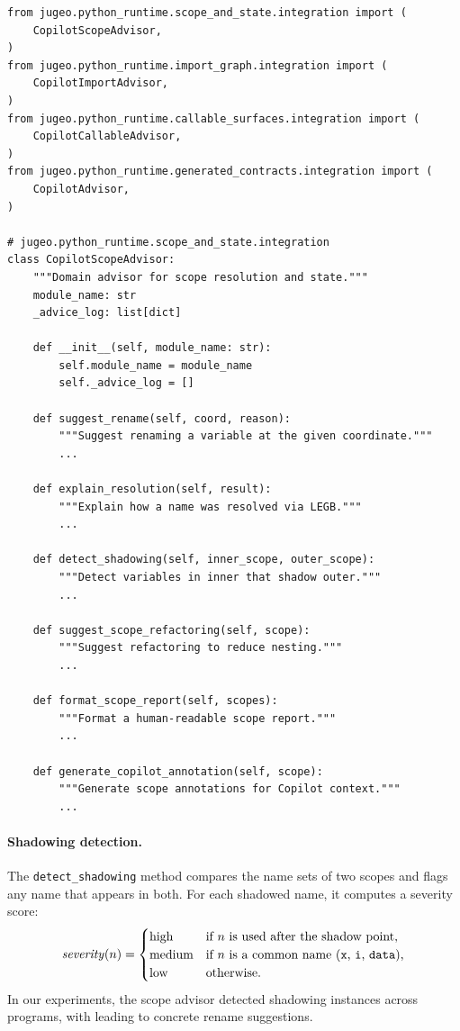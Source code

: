 \documentclass[11pt]{article}
\begin{document}
\begin{lstlisting}[style=jugeo-python, caption={$\mathsf{CopilotScopeAdvisor}$ interface.}, label={lst:scope-advisor}]
from jugeo.python_runtime.scope_and_state.integration import (
    CopilotScopeAdvisor,
)
from jugeo.python_runtime.import_graph.integration import (
    CopilotImportAdvisor,
)
from jugeo.python_runtime.callable_surfaces.integration import (
    CopilotCallableAdvisor,
)
from jugeo.python_runtime.generated_contracts.integration import (
    CopilotAdvisor,
)

# jugeo.python_runtime.scope_and_state.integration
class CopilotScopeAdvisor:
    """Domain advisor for scope resolution and state."""
    module_name: str
    _advice_log: list[dict]

    def __init__(self, module_name: str):
        self.module_name = module_name
        self._advice_log = []

    def suggest_rename(self, coord, reason):
        """Suggest renaming a variable at the given coordinate."""
        ...

    def explain_resolution(self, result):
        """Explain how a name was resolved via LEGB."""
        ...

    def detect_shadowing(self, inner_scope, outer_scope):
        """Detect variables in inner that shadow outer."""
        ...

    def suggest_scope_refactoring(self, scope):
        """Suggest refactoring to reduce nesting."""
        ...

    def format_scope_report(self, scopes):
        """Format a human-readable scope report."""
        ...

    def generate_copilot_annotation(self, scope):
        """Generate scope annotations for Copilot context."""
        ...
\end{lstlisting}

\paragraph{Shadowing detection.}
The \texttt{detect\_shadowing} method compares the name sets of two
scopes and flags any name that appears in both.  For each shadowed
name, it computes a severity score:
\[
  \mathit{severity}(n) = \begin{cases}
    \text{high}   & \text{if $n$ is used after the shadow point,} \\
    \text{medium} & \text{if $n$ is a common name (\texttt{x}, \texttt{i}, \texttt{data}),} \\
    \text{low}    & \text{otherwise.}
  \end{cases}
\]
In our experiments, the scope advisor detected \ppXCscopeShadowDetections{}
shadowing instances across \ppXCprogramCount{} programs, with
\ppXCscopeRenameSuggestions{} leading to concrete rename suggestions.
\end{document}
